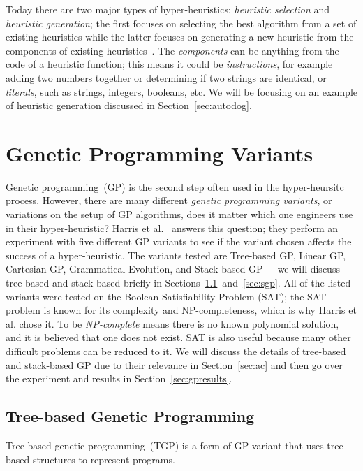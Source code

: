 \documentclass{sig-alternate}
\begin{document}
Today there are two major types of hyper-heuristics: \textit{heuristic selection} and \textit{heuristic generation}; the first focuses on selecting the best algorithm from a set of existing heuristics while the latter focuses on generating a new heuristic from the components of existing heuristics~\cite{pappa:2014}. The \textit{components} can be anything from the code of a heuristic function; this means it could be \textit{instructions}, for example adding two numbers together or determining if two strings are identical, or \textit{literals}, such as strings, integers, booleans, etc. We will be focusing on an example of heuristic generation discussed in Section~\ref{sec:autodog}.

\section{Genetic Programming Variants}
\label{sec:gpvariants}
Genetic programming~(GP) is the second step often used in the hyper-heursitc process. However, there are many different \textit{genetic programming variants}, or variations on the setup of GP algorithms, does it matter which one engineers use in their hyper-heuristic? Harris et al.~\cite{harris:2015} answers this question; they perform an experiment with five different GP variants to see if the variant chosen affects the success of a hyper-heuristic. The variants tested are Tree-based GP, Linear GP, Cartesian GP, Grammatical Evolution, and Stack-based GP~--~we will discuss tree-based and stack-based briefly in Sections~\ref{sec:tgp}~and~\ref{sec:sgp}. All of the listed variants were tested on the Boolean Satisfiability Problem (SAT); the SAT problem is known for its complexity and NP-completeness, which is why Harris et al. chose it. To be \textit{NP-complete} means there is no known polynomial solution, and it is believed that one does not exist. SAT is also useful because many other difficult problems can be reduced to it. We will discuss the details of tree-based and stack-based GP due to their relevance in Section~\ref{sec:ac} and then go over the experiment and results in Section~\ref{sec:gpresults}.

\subsection{Tree-based Genetic Programming}
\label{sec:tgp}
Tree-based genetic programming~(TGP) is a form of GP variant that uses tree-based structures to represent programs.
\end{document}
